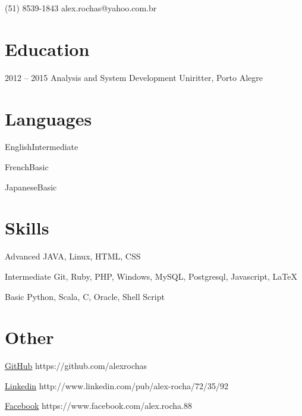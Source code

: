 \documentclass{tccv}
\begin{document}
{(51) 8539-1843 }
{alex.rochas@yahoo.com.br}

\section{Education}

\begin{yearlist}

\item{2012 -- 2015}
    {Analysis and System Development}
    {Uniritter, Porto Alegre}

\end{yearlist}

\section{Languages}

\begin{factlist}
\item{English}{Intermediate}
\item{French}{Basic}
\item{Japanese}{Basic}
\end{factlist}

\section{Skills}

\begin{factlist}

\item{Advanced}
    {JAVA, Linux, HTML, CSS}

\item{Intermediate}
    {Git, Ruby, PHP, Windows, MySQL, Postgresql, Javascript, {\LaTeX}}

\item{Basic}
    {Python, Scala, C, Oracle, Shell Script}

\end{factlist}

\section{Other}

\begin{factlist}

\item{\href{https://github.com/alexrochas}{GitHub}}
    {https://github.com/alexrochas}

\item{\href{http://www.linkedin.com/pub/alex-rocha/72/35/92}{Linkedin}}
    {http://www.linkedin.com/pub/\linebreak[1]alex-rocha/72/35/92}

\item{\href{https://www.facebook.com/alex.rocha.88}{Facebook}}
{https://www.facebook.com/\linebreak[1]alex.rocha.88}

\end{factlist}
\end{document}
